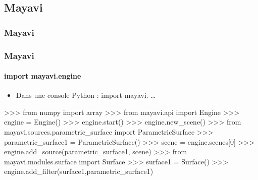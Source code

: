 \subsection{Mayavi}
\begin{frame}
\frametitle{Mayavi}
\framesubtitle{}
{}
\end{frame}
\begin{frame}[fragile]
\frametitle{Mayavi}
\framesubtitle{import mayavi.engine}
\begin{itemize}
 \item Dans une console Python : import mayavi. \dots
\end{itemize}
\begin{pythonConsole}
>>> from numpy import array
>>> from mayavi.api import Engine
>>> engine = Engine()
>>> engine.start()
>>> engine.new_scene()
>>> from mayavi.sources.parametric_surface import ParametricSurface
>>> parametric_surface1 = ParametricSurface()
>>> scene = engine.scenes[0]
>>> engine.add_source(parametric_surface1, scene)
>>> from mayavi.modules.surface import Surface
>>> surface1 = Surface()
>>> engine.add_filter(surface1,parametric_surface1)
\end{pythonConsole}
\end{frame}
